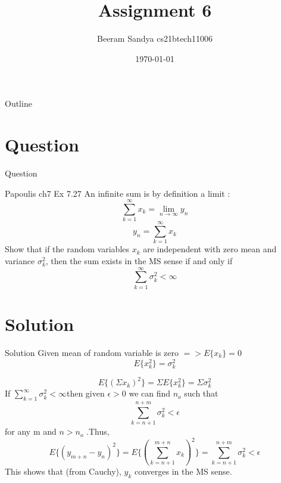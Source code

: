 \documentclass{beamer}
\title{Assignment 6}
\author{Beeram Sandya cs21btech11006}
\date{\today}
\begin{document}
\begin{frame}
    \titlepage 
\end{frame}

\logo{}


\begin{frame}{Outline}
    \tableofcontents
\end{frame}

\section{Question}
\begin{frame}{Question}
\begin{block}{Papoulis ch7 Ex 7.27}
An infinite sum is by definition a limit :
\[\sum_{k=1}^{\infty} x_k = \lim_{n\to\infty} y_n \] 
\[y_n = \sum_{k=1}^{\infty} x_k\]
Show that if the random variables $x_k$ are independent with zero mean and variance 
$\sigma_k^2$, then the sum exists in the MS sense if and only if 
\[\sum_{k=1}^{\infty} \sigma_k^2 < \infty\] 

\end{block}
\end{frame}

\section{Solution}
\begin{frame}{Solution}
Given mean of random variable is zero $=> E\{x_k\}=0$ \\
\[E\{x_k^2\} = \sigma_k^2\]

\[E\{(\Sigma x_k)^2\} = \Sigma E\{x_k^2\} = \Sigma \sigma_k^2\] 
If $\sum_{k=1}^{\infty} \sigma_k^2 < \infty$then given $\epsilon > 0$ we can find $n_o$ such that \[\sum_{k=n+1}^{n+m} \sigma_k^2 < \epsilon \] for any m and $n>n_o$
.Thus,
\[E\{(y_{m+n}-y_n)^2\} = E\{(\sum_{k=n+1}^{m+n} x_k)^2\} = \sum_{k=n+1}^{n+m} \sigma_k^2 < \epsilon\]
This shows that (from Cauchy), $y_k$ converges in the MS sense.

\end{frame} 
\end{document}
